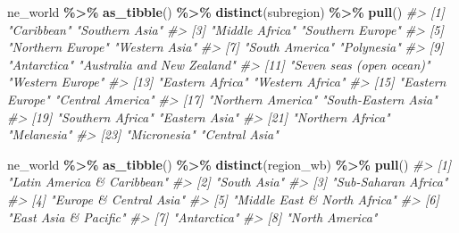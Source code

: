 \documentclass[
  xelatex, ja=standard]{bxjsbook}
\newenvironment{Shaded}{\begin{snugshade}}{\end{snugshade}}
\newcommand{\CommentTok}[1]{\textcolor[rgb]{0.56,0.35,0.01}{\textit{#1}}}
\newcommand{\FunctionTok}[1]{\textcolor[rgb]{0.13,0.29,0.53}{\textbf{#1}}}
\newcommand{\NormalTok}[1]{#1}
\newcommand{\SpecialCharTok}[1]{\textcolor[rgb]{0.81,0.36,0.00}{\textbf{#1}}}
\theoremstyle{definition}
\theoremstyle{definition}
\theoremstyle{definition}
\theoremstyle{definition}
\theoremstyle{remark}
\begin{document}
\begin{Shaded}
\begin{Highlighting}[]
\NormalTok{ne\_world }\SpecialCharTok{\%\textgreater{}\%} \FunctionTok{as\_tibble}\NormalTok{() }\SpecialCharTok{\%\textgreater{}\%} \FunctionTok{distinct}\NormalTok{(subregion) }\SpecialCharTok{\%\textgreater{}\%} \FunctionTok{pull}\NormalTok{()}
\CommentTok{\#\textgreater{}  [1] "Caribbean"                 "Southern Asia"            }
\CommentTok{\#\textgreater{}  [3] "Middle Africa"             "Southern Europe"          }
\CommentTok{\#\textgreater{}  [5] "Northern Europe"           "Western Asia"             }
\CommentTok{\#\textgreater{}  [7] "South America"             "Polynesia"                }
\CommentTok{\#\textgreater{}  [9] "Antarctica"                "Australia and New Zealand"}
\CommentTok{\#\textgreater{} [11] "Seven seas (open ocean)"   "Western Europe"           }
\CommentTok{\#\textgreater{} [13] "Eastern Africa"            "Western Africa"           }
\CommentTok{\#\textgreater{} [15] "Eastern Europe"            "Central America"          }
\CommentTok{\#\textgreater{} [17] "Northern America"          "South{-}Eastern Asia"       }
\CommentTok{\#\textgreater{} [19] "Southern Africa"           "Eastern Asia"             }
\CommentTok{\#\textgreater{} [21] "Northern Africa"           "Melanesia"                }
\CommentTok{\#\textgreater{} [23] "Micronesia"                "Central Asia"}
\end{Highlighting}
\end{Shaded}

\begin{Shaded}
\begin{Highlighting}[]
\NormalTok{ne\_world }\SpecialCharTok{\%\textgreater{}\%} \FunctionTok{as\_tibble}\NormalTok{() }\SpecialCharTok{\%\textgreater{}\%} \FunctionTok{distinct}\NormalTok{(region\_wb) }\SpecialCharTok{\%\textgreater{}\%} \FunctionTok{pull}\NormalTok{()}
\CommentTok{\#\textgreater{} [1] "Latin America \& Caribbean" }
\CommentTok{\#\textgreater{} [2] "South Asia"                }
\CommentTok{\#\textgreater{} [3] "Sub{-}Saharan Africa"        }
\CommentTok{\#\textgreater{} [4] "Europe \& Central Asia"     }
\CommentTok{\#\textgreater{} [5] "Middle East \& North Africa"}
\CommentTok{\#\textgreater{} [6] "East Asia \& Pacific"       }
\CommentTok{\#\textgreater{} [7] "Antarctica"                }
\CommentTok{\#\textgreater{} [8] "North America"}
\end{Highlighting}
\end{Shaded}
\end{document}
